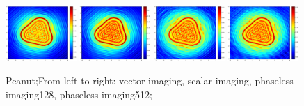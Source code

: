 \documentclass[12pt]{iopart}
\begin{document}
\begin{figure}
	\centering
	\includegraphics[width=0.24\textwidth]{./graphic_phase/pear_r_10_k_4_vector.eps}
	\includegraphics[width=0.24\textwidth]{./graphic_phase/pear_r_10_k_4_scalar.eps}
	\includegraphics[width=0.24\textwidth]{./graphic_phase/pear_r_10_k_4_phaseless_n_128_bias_100.eps}
	\includegraphics[width=0.24\textwidth]{./graphic_phase/pear_r_10_k_4_phaseless_n_512_bias_100.eps}
	\caption{Peanut;From left to right: vector imaging, scalar imaging, phaseless imaging128, phaseless imaging512;  }\label{figure_pear_phaless}
\end{figure}
\end{document}
